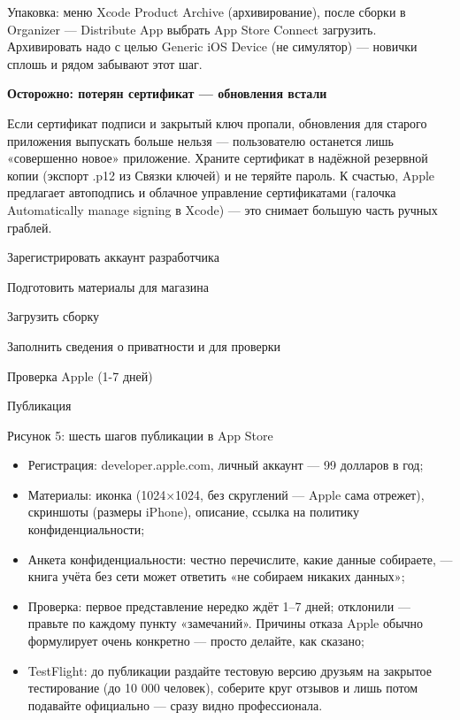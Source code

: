 Упаковка: меню Xcode Product Archive (архивирование), после сборки в Organizer — Distribute App выбрать App Store Connect загрузить. Архивировать надо с целью Generic iOS Device (не симулятор) — новички сплошь и рядом забывают этот шаг.

\textbf{Осторожно: потерян сертификат — обновления встали}\par

Если сертификат подписи и закрытый ключ пропали, обновления для старого приложения выпускать больше нельзя — пользователю останется лишь «совершенно новое» приложение. Храните сертификат в надёжной резервной копии (экспорт .p12 из Связки ключей) и не теряйте пароль. К счастью, Apple предлагает автоподпись и облачное управление сертификатами (галочка Automatically manage signing в Xcode) — это снимает большую часть ручных граблей.


Зарегистрировать аккаунт разработчика

Подготовить материалы для магазина

Загрузить сборку

Заполнить сведения о приватности и для проверки

Проверка Apple (1-7 дней)

Публикация

\begin{center}\small\color{gray}Рисунок 5: шесть шагов публикации в App Store\end{center}

\begin{itemize}
  \item Регистрация: developer.apple.com, личный аккаунт — 99 долларов в год;
  \item Материалы: иконка (1024×1024, без скруглений — Apple сама отрежет), скриншоты (размеры iPhone), описание, ссылка на политику конфиденциальности;
  \item Анкета конфиденциальности: честно перечислите, какие данные собираете, — книга учёта без сети может ответить «не собираем никаких данных»;
  \item Проверка: первое представление нередко ждёт 1–7 дней; отклонили — правьте по каждому пункту «замечаний». Причины отказа Apple обычно формулирует очень конкретно — просто делайте, как сказано;
  \item TestFlight: до публикации раздайте тестовую версию друзьям на закрытое тестирование (до 10 000 человек), соберите круг отзывов и лишь потом подавайте официально — сразу видно профессионала.
\end{itemize}

